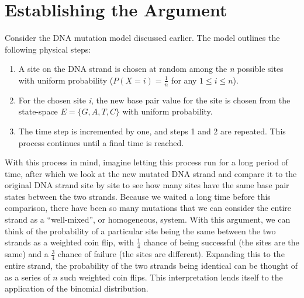 \documentclass{article}
\begin{document}
	\section{Establishing the Argument}
		Consider the DNA mutation model discussed earlier. The model outlines the following physical steps:
		\begin{enumerate}
			\item A site on the DNA strand is chosen at random among the \textit{n} possible sites with uniform probability ($P(X=i)=\frac{1}{n}$ for any $1\le i \le n$).
			\item For the chosen site \textit{i}, the new base pair value for the site is chosen from the state-space $E = \{G,A,T,C\}$ with uniform probability.
			\item The time step is incremented by one, and steps 1 and 2 are repeated. This process continues until a final time is reached.
		\end{enumerate}
		With this process in mind, imagine letting this process run for a long period of time, after which we look at the new mutated DNA strand and compare it to the original DNA strand site by site to see how many sites have the same base pair states between the two strands. Because we waited a long time before this comparison, there have been so many mutations that we can consider the entire strand as a ``well-mixed'', or homogeneous, system. With this argument, we can think of the probability of a particular site being the same between the two strands as a weighted coin flip, with $\frac{1}{4}$ chance of being successful (the sites are the same) and a $\frac{3}{4}$ chance of failure (the sites are different). Expanding this to the entire strand, the probability of the two strands being identical can be thought of as a series of $n$ such weighted coin flips. This interpretation lends itself to the application of the binomial distribution.
\end{document}
